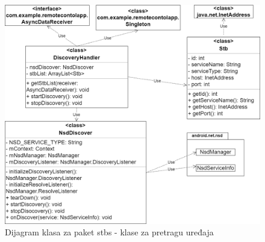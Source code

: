 \documentclass[implementacija.tex]{subfiles}
\begin{document}

\begin{figure}[!ht]
  \centering
  \includegraphics[width=\textwidth]{Implementacija/dijagrami/stb_package_1.drawio.png}
    \caption{Dijagram klasa za paket stbs - klase za pretragu uređaja}
    \label{fig:dijagramStbs1}
\end{figure}
\end{document}
